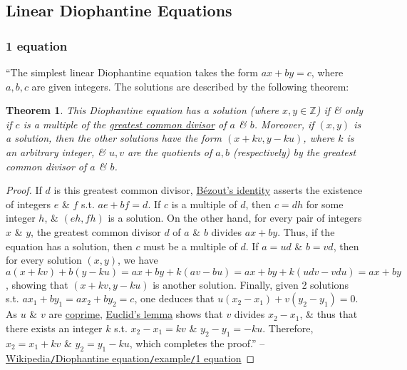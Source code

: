 \documentclass{article}
\numberwithin{equation}{section}
\newtheorem{theorem}{Theorem}[section]
\begin{document}
\subsection{Linear Diophantine Equations}

\subsubsection{1 equation}
``The simplest linear Diophantine equation takes the form $ax + by = c$, where $a,b,c$ are given integers. The solutions are described by the following theorem:

\begin{theorem}
	This Diophantine equation has a solution (where $x,y\in\mathbb{Z}$) if \& only if $c$ is a multiple of the \href{https://en.wikipedia.org/wiki/Greatest_common_divisor}{greatest common divisor} of $a$ \& $b$. Moreover, if $(x,y)$ is a solution, then the other solutions have the form $(x + kv,y - ku)$, where $k$ is an arbitrary integer, \& $u,v$ are the quotients of $a,b$ (respectively) by the greatest common divisor of $a$ \& $b$.
\end{theorem}

\begin{proof}
	If $d$ is this greatest common divisor, \href{https://en.wikipedia.org/wiki/B%C3%A9zout%27s_identity}{B\'ezout's identity} asserts the existence of integers $e$ \& $f$ s.t. $ae + bf = d$. If $c$ is a multiple of $d$, then $c = dh$ for some integer $h$, \& $(eh,fh)$ is a solution. On the other hand, for every pair of integers $x$ \& $y$, the greatest common divisor $d$ of $a$ \& $b$ divides $ax + by$. Thus, if the equation has a solution, then $c$ must be a multiple of $d$. If $a = ud$ \& $b = vd$, then for every solution $(x,y)$, we have $a(x + kv) + b(y - ku) = ax + by + k(av - bu) = ax + by + k(udv - vdu) = ax + by$, showing that $(x + kv,y - ku)$ is another solution. Finally, given 2 solutions s.t. $ax_1 + by_1 = ax_2 + by_2 = c$, one deduces that $u(x_2 - x_1) + v(y_2 - y_1) = 0$. As $u$ \& $v$ are \href{https://en.wikipedia.org/wiki/Coprime}{coprime}, \href{https://en.wikipedia.org/wiki/Euclid%27s_lemma}{Euclid's lemma} shows that $v$ divides $x_2 - x_1$, \& thus that there exists an integer $k$ s.t. $x_2 - x_1 = kv$ \& $y_2 - y_1 = -ku$. Therefore, $x_2 = x_1 + kv$ \& $y_2 = y_1 - ku$, which completes the proof.'' -- \href{https://en.wikipedia.org/wiki/Diophantine_equation#One_equation}{Wikipedia\texttt{/}Diophantine equation\texttt{/}example\texttt{/}1 equation}
\end{proof}
\end{document}
